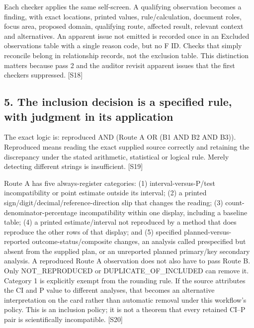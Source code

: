 \documentclass[10pt,a4paper]{article}
\begin{document}
Each checker applies the same self-\allowbreak{}screen.\allowbreak{} A qualifying observation becomes a finding, with exact locations, printed values, rule/\allowbreak{}calculation, document roles, focus area, proposed domain, qualifying route, affected result, relevant context and alternatives.\allowbreak{} An apparent issue not emitted is recorded once in an Excluded observations table with a single reason code, but no F ID.\allowbreak{} Checks that simply reconcile belong in relationship records, not the exclusion table.\allowbreak{} This distinction matters because pass 2 and the auditor revisit apparent issues that the first checkers suppressed.\allowbreak{} [S18]\par
\subsection*{5.\allowbreak{} The inclusion decision is a specified rule, with judgment in its application}
The exact logic is: reproduced AND (Route A OR (B1 AND B2 AND B3)).\allowbreak{} Reproduced means reading the exact supplied source correctly and retaining the discrepancy under the stated arithmetic, statistical or logical rule.\allowbreak{} Merely detecting different strings is insufficient.\allowbreak{} [S19]\par
Route A has five always-\allowbreak{}register categories: (1) interval-\allowbreak{}versus-\allowbreak{}P/\allowbreak{}test incompatibility or point estimate outside its interval; (2) a printed sign/\allowbreak{}digit/\allowbreak{}decimal/\allowbreak{}reference-\allowbreak{}direction slip that changes the reading; (3) count-\allowbreak{}denominator-\allowbreak{}percentage incompatibility within one display, including a baseline table; (4) a printed estimate/\allowbreak{}interval not reproduced by a method that does reproduce the other rows of that display; and (5) specified planned-\allowbreak{}versus-\allowbreak{}reported outcome-\allowbreak{}status/\allowbreak{}composite changes, an analysis called prespecified but absent from the supplied plan, or an unreported planned primary/\allowbreak{}key secondary analysis.\allowbreak{} A reproduced Route A observation does not also have to pass Route B.\allowbreak{} Only NOT\_\allowbreak{}REPRODUCED or DUPLICATE\_\allowbreak{}OF\_\allowbreak{}INCLUDED can remove it.\allowbreak{} Category 1 is explicitly exempt from the rounding rule.\allowbreak{} If the source attributes the CI and P value to different analyses, that becomes an alternative interpretation on the card rather than automatic removal under this workflow's policy.\allowbreak{} This is an inclusion policy; it is not a theorem that every retained CI–P pair is scientifically incompatible.\allowbreak{} [S20]\par
\end{document}
